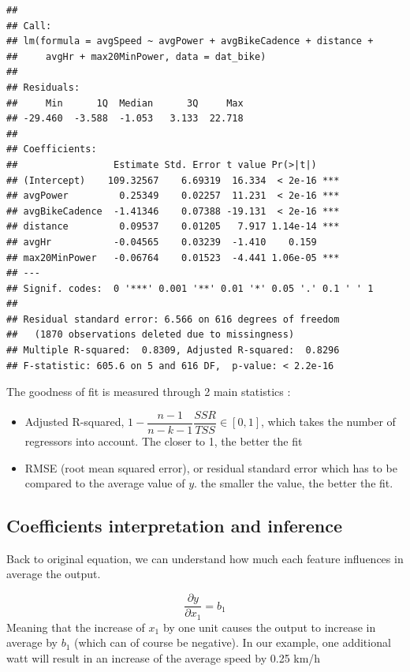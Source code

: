 \documentclass[
]{book}
\providecommand{\tightlist}{%
  \setlength{\itemsep}{0pt}\setlength{\parskip}{0pt}}
\begin{document}
\begin{verbatim}
## 
## Call:
## lm(formula = avgSpeed ~ avgPower + avgBikeCadence + distance + 
##     avgHr + max20MinPower, data = dat_bike)
## 
## Residuals:
##     Min      1Q  Median      3Q     Max 
## -29.460  -3.588  -1.053   3.133  22.718 
## 
## Coefficients:
##                 Estimate Std. Error t value Pr(>|t|)    
## (Intercept)    109.32567    6.69319  16.334  < 2e-16 ***
## avgPower         0.25349    0.02257  11.231  < 2e-16 ***
## avgBikeCadence  -1.41346    0.07388 -19.131  < 2e-16 ***
## distance         0.09537    0.01205   7.917 1.14e-14 ***
## avgHr           -0.04565    0.03239  -1.410    0.159    
## max20MinPower   -0.06764    0.01523  -4.441 1.06e-05 ***
## ---
## Signif. codes:  0 '***' 0.001 '**' 0.01 '*' 0.05 '.' 0.1 ' ' 1
## 
## Residual standard error: 6.566 on 616 degrees of freedom
##   (1870 observations deleted due to missingness)
## Multiple R-squared:  0.8309,	Adjusted R-squared:  0.8296 
## F-statistic: 605.6 on 5 and 616 DF,  p-value: < 2.2e-16
\end{verbatim}

The goodness of fit is measured through 2 main statistics :

\begin{itemize}
\tightlist
\item
  Adjusted R-squared, \(1- \dfrac{n-1}{n-k-1} \dfrac{SSR}{TSS} \in [0,1]\), which takes the number of regressors into account. The closer to 1, the better the fit
\item
  RMSE (root mean squared error), or residual standard error which has to be compared to the average value of \(y\). the smaller the value, the better the fit.
\end{itemize}

\hypertarget{coefficients-interpretation-and-inference}{%
\subsection{Coefficients interpretation and inference}\label{coefficients-interpretation-and-inference}}

Back to original equation, we can understand how much each feature influences in average the output.

\[ \dfrac{\partial y}{\partial x_1} = b_1\]
Meaning that the increase of \(x_1\) by one unit causes the output to increase in average by \(b_1\) (which can of course be negative). In our example, one additional watt will result in an increase of the average speed by 0.25 km/h
\end{document}
